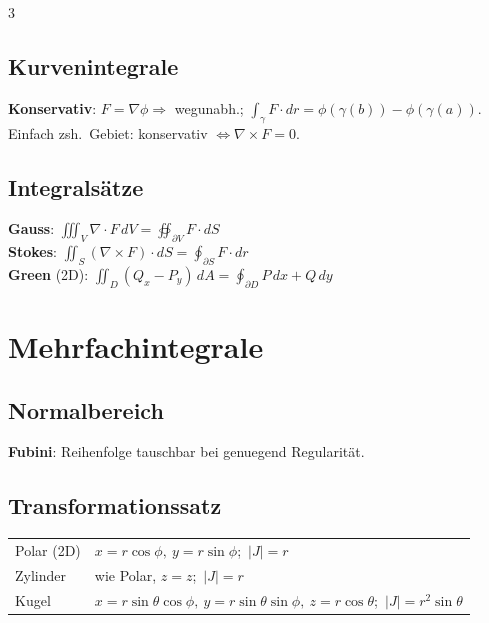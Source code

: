 \documentclass[8pt,a4paper]{extarticle}
\begin{document}
\begin{multicols*}{3}
\subsection{Kurvenintegrale}
\textbf{Konservativ}: $F=\nabla\phi\Rightarrow$ wegunabh.; $\int_\gamma F\cdot dr=\phi(\gamma(b))-\phi(\gamma(a))$.\\
Einfach zsh.\ Gebiet: konservativ $\Leftrightarrow \nabla\times F=0$.

\subsection{Integrals\"atze}
\textbf{Gauss}: $\iiint_V\!\nabla\!\cdot\!F\,dV=\oiint_{\partial V}\!F\!\cdot\!dS$\\
\textbf{Stokes}: $\iint_S\!(\nabla\!\times\!F)\!\cdot\!dS=\oint_{\partial S}\!F\!\cdot\!dr$\\
\textbf{Green} (2D): $\iint_D(Q_x{-}P_y)\,dA=\oint_{\partial D}\!P\,dx+Q\,dy$

\section{Mehrfachintegrale}
\subsection{Normalbereich}
\textbf{Fubini}: Reihenfolge tauschbar bei genuegend Regularit\"at.

\subsection{Transformationssatz}
\begin{tabularx}{\linewidth}{@{}l@{\ }X@{}}
Polar (2D) & $x{=}r\cos\phi,\ y{=}r\sin\phi$;\ $|J|{=}r$ \\
Zylinder & wie Polar, $z{=}z$;\ $|J|{=}r$ \\
Kugel & $x{=}r\sin\theta\cos\phi,\ y{=}r\sin\theta\sin\phi,\ z{=}r\cos\theta$;\ $|J|{=}r^2\sin\theta$ \\
\end{tabularx}


\end{multicols*}
\end{document}
